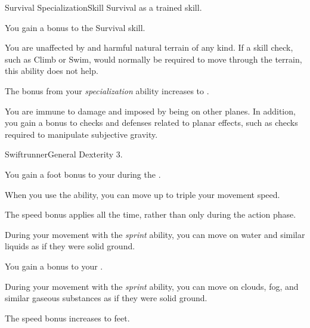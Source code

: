   \begin{feat}{Survival Specialization}{Skill}
    \featpre Survival as a trained skill.

     You gain a  bonus to the Survival skill.

     You are unaffected by  and harmful natural terrain of any kind.
    If a skill check, such as Climb or Swim, would normally be required to move through the terrain, this ability does not help.

     The bonus from your \textit{specialization} ability increases to .

     You are immune to damage and  imposed by being on other planes.
    In addition, you gain a  bonus to checks and defenses related to planar effects, such as checks required to manipulate subjective gravity.
  \end{feat}

  \begin{feat}{Swiftrunner}{General}
    \featpre Dexterity 3.

     You gain a  foot bonus to your  during the .

     When you use the  ability, you can move up to triple your movement speed.

     The speed bonus applies all the time, rather than only during the action phase.

     During your movement with the \textit{sprint} ability, you can move on water and similar liquids as if they were solid ground.

     You gain a  bonus to your .

     During your movement with the \textit{sprint} ability, you can move on clouds, fog, and similar gaseous substances as if they were solid ground.

     The speed bonus increases to  feet.
  \end{feat}

